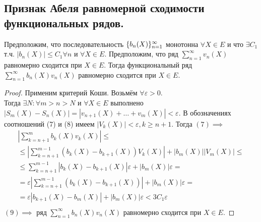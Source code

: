 \documentclass[main]{subfiles}
\begin{document}
\subsection{Признак Абеля равномерной сходимости функциональных рядов.}
\begin{theorem}
     Предположим, что последовательность $\fnn[b_n(X)]$ монотонна $\forall X\in E$ 
     и что $\exists C_1$ т.ч. $|b_n(X)|\leq C_1 \forall n$ и $\forall X\in E.$ 
     Предположим, что ряд $\sum^{\infty}_{n=1} v_n(X)$ равномерно сходится при $X\in E.$ 
     Тогда функциональный ряд $\sum^{\infty}_{n=1} b_n(X)v_n(X)$ равномерно сходится 
     при $X\in E.$ \end{theorem}
\begin{proof}
     Применим критерий Коши. Возьмём $\forall \varepsilon>0.$ \\
      Тогда $\exists N: \forall m>n>N$ и $\forall X\in E$ выполнено
       $|S_m(X)-S_n(X)|=|v_{n+1}(X)+\dots+v_m(X)|<\varepsilon.$ В обозначениях
        соотношений (7) и (8) имеем $|V_k(X)|<\varepsilon, k\geq n+1.$ Тогда $(7) \implies$
       \begin{multline*}
 \left|\sum_{k=n+1}^m b_k(X)v_k(X)\right|\leq  \\ \leq 
 \left|\sum_{k=n+1}^{m-1}(b_k(X)-b_{k+1}(X))V_k(X)\right|+ |b_m(X)||V_m(X)|\leq \\
 \leq \sum_{k=n+1}^{m-1}|b_k(X)-b_{k+1}(X)|\varepsilon + |b_m(X)|\varepsilon =\\ =\varepsilon
  |\sum_{k=n+1}^{m-1}(b_k(X)-b_{k+1}(X))|+|b_m(X)|\varepsilon= \\
 =\varepsilon|b_{k+1}(X)-b_m(X)|+|b_m(X)|\varepsilon<3C_1\varepsilon\tag{9} \\
\end{multline*}
$(9)\implies$ ряд $\sum^{\infty}_{n=1} b_n(X)v_n(X)$ равномерно сходится при $X\in E.$ \end{proof}
 
\end{document}
